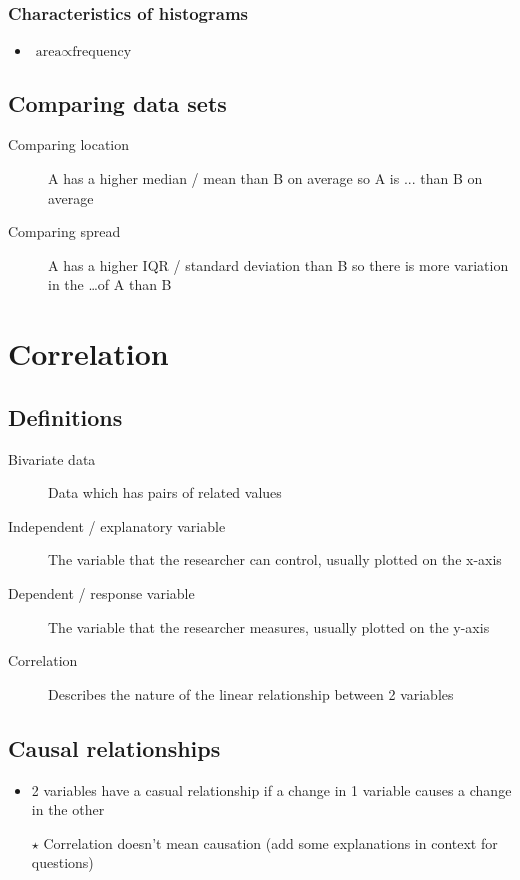 \subsection{Characteristics of histograms}
\begin{itemize}
	\item $\text{area}\propto\text{frequency}$
\end{itemize}

\section{Comparing data sets}
\begin{description}
	\item[Comparing location] A has a higher median / mean than B on average so A is ... than B on average
	\item[Comparing spread] A has a higher IQR / standard deviation than B so there is more variation in the \dots of A than B
\end{description}






\chapter{Correlation}
\section{Definitions}
\begin{description}
	\item[Bivariate data] Data which has pairs of related values
	\item[Independent / explanatory variable] The variable that the researcher can control, usually plotted on the x-axis
	\item[Dependent / response variable] The variable that the researcher measures, usually plotted on the y-axis
	\item[Correlation] Describes the nature of the linear relationship between 2 variables
\end{description}

\section{Causal relationships}
\begin{itemize}
	\item 2 variables have a casual relationship if a change in 1 variable causes a change in the other
	\item[$\star$] Correlation doesn't mean causation (add some explanations in context for questions)
\end{itemize}


